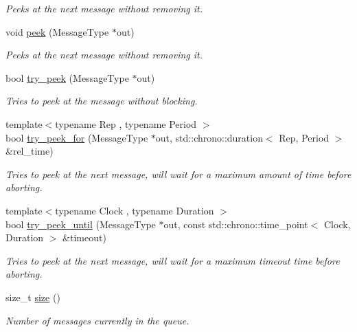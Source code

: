 \begin{DoxyCompactItemize}
\begin{DoxyCompactList}\small\item\em Peeks at the next message without removing it. \end{DoxyCompactList}\item 
void \hyperlink{classcpen333_1_1process_1_1message__queue_a0d6f0bb9911b01f601bb67551007be3d}{peek} (Message\+Type $\ast$out)
\begin{DoxyCompactList}\small\item\em Peeks at the next message without removing it. \end{DoxyCompactList}\item 
bool \hyperlink{classcpen333_1_1process_1_1message__queue_a344d81de71e73ab318d2bf4a4a852a1b}{try\+\_\+peek} (Message\+Type $\ast$out)
\begin{DoxyCompactList}\small\item\em Tries to peek at the message without blocking. \end{DoxyCompactList}\item 
{\footnotesize template$<$typename Rep , typename Period $>$ }\\bool \hyperlink{classcpen333_1_1process_1_1message__queue_a62077115caee87a6eccd527924015748}{try\+\_\+peek\+\_\+for} (Message\+Type $\ast$out, std\+::chrono\+::duration$<$ Rep, Period $>$ \&rel\+\_\+time)
\begin{DoxyCompactList}\small\item\em Tries to peek at the next message, will wait for a maximum amount of time before aborting. \end{DoxyCompactList}\item 
{\footnotesize template$<$typename Clock , typename Duration $>$ }\\bool \hyperlink{classcpen333_1_1process_1_1message__queue_ae518346095033df725270dfeb866cdb4}{try\+\_\+peek\+\_\+until} (Message\+Type $\ast$out, const std\+::chrono\+::time\+\_\+point$<$ Clock, Duration $>$ \&timeout)
\begin{DoxyCompactList}\small\item\em Tries to peek at the next message, will wait for a maximum timeout time before aborting. \end{DoxyCompactList}\item 
size\+\_\+t \hyperlink{classcpen333_1_1process_1_1message__queue_aab604a8c153f7f918762abc7f2380396}{size} ()
\begin{DoxyCompactList}\small\item\em Number of messages currently in the queue. \end{DoxyCompactList}\item 

\end{DoxyCompactItemize}

